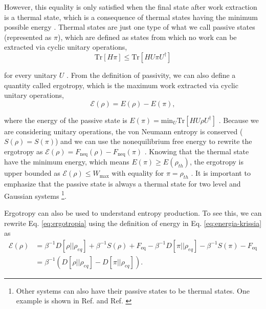 \noindent However, this equality is only satisfied when the final state after work extraction is a thermal state, which is a consequence of thermal states having the minimum possible energy \cite{alicki-2013}. Thermal states are just one type of what we call passive states (represented as $\pi$), which are defined as states from which no work can be extracted via cyclic unitary operations,
\begin{equation}
    \text{Tr}[{H} {\pi}] \leq \text{Tr}[{H} {U} {\pi} {U}^\dagger]
\end{equation}

\noindent for every unitary $U$ \cite{campaioli-2024}. From the definition of passivity, we can also define a quantity called ergotropy, which is the maximum work extracted via cyclic unitary operations,
\begin{equation}
    \mathcal{E} ({\rho}) = E({\rho}) - E({\pi}),
    \label{eq:ergotropia}
\end{equation}

\noindent where the energy of the passive state is $E({\pi}) = \text{min}_{{U}} \text{Tr} [{H} {U} {\rho} {U}^\dagger]$ \cite{medina-2025, allahverdyan-2004}. Because we are considering unitary operations, the von Neumann entropy is conserved ($S(\rho)=S(\pi)$) and we can use the nonequilibrium free energy to rewrite the ergotropy as $\mathcal{E} (\rho) = F_{\text{neq}}(\rho) - F_{\text{neq}}(\pi)$ \cite{biswas-2022}. Knowing that the thermal state have the minimum energy, which means $E(\pi) \geq E(\rho_{th})$, the ergotropy is upper bounded as $\mathcal{E} ({\rho}) \leq W_{\text{max}}$ with equality for $\pi = \rho_{th}$ \cite{biswas-2022, alicki-2013, campaioli-2024}. It is important to emphasize that the passive state is always a thermal state for two level and Gaussian systems \footnote{Other systems can also have their passive states to be thermal states. One example is shown in Ref. \cite{pusz-1978} and Ref. \cite{lenard-1978}}.

Ergotropy can also be used to understand entropy production. To see this, we can rewrite Eq. \eqref{eq:ergotropia} using the definition of energy in Eq. \eqref{eq:energia-krissia} as
\begin{equation}
    \begin{split}
        \mathcal{E} ({\rho}) &= \beta^{-1} D[{\rho} || \rho_{eq}] + \beta^{-1} S({\rho}) + F_{\text{eq}} - \beta^{-1} D[\pi || \rho_{eq}] - \beta^{-1} S(\pi) - F_{\text{eq}}\\
        &= \beta^{-1} (D[{\rho} || \rho_{eq}] - D[\pi || \rho_{eq}]).
    \end{split}
\end{equation}

